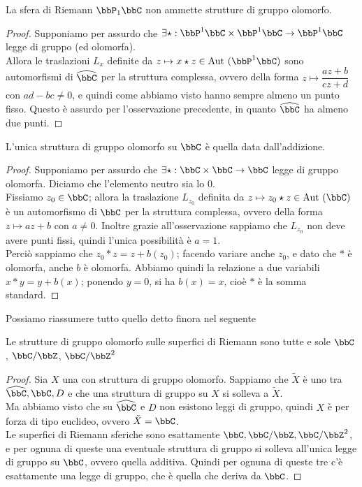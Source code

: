 \begin{proposizione}
La sfera di Riemann $\bbP_{1}\bbC $ non ammette strutture di gruppo olomorfo.
\end{proposizione}
\begin{proof}
    Supponiamo per assurdo che $\exists \star: \bbP^1\bbC \times \bbP^1\bbC \rar \bbP^1\bbC$ legge di gruppo (ed olomorfa).\\
    Allora le traslazioni $L_x$ definite da $z \mapsto x \star z \in \Aut(\bbP^1\bbC)$ sono automorfismi di $\hat\bbC$ per la struttura complessa, ovvero della forma $z\mapsto\dfrac{az+b}{cz+d}$ con $ad-bc\neq0$, e quindi come abbiamo visto hanno sempre almeno un punto fisso.
    Questo è assurdo per l'osservazione precedente, in quanto $\hat\bbC$ ha almeno due punti.
\end{proof}

\begin{proposizione}
L'unica struttura di gruppo olomorfo su $\bbC$ è quella data dall'addizione.
\end{proposizione}
\begin{proof}
    Supponiamo per assurdo che $\exists \star: \bbC \times \bbC \rar \bbC$ legge di gruppo olomorfa. Diciamo che l'elemento neutro sia lo $0$.\\
    Fissiamo $z_0\in\bbC$; allora la traslazione $L_{z_0}$ definita da $z \mapsto z_0 \star z \in \Aut(\bbC)$ è un automorfismo di $\bbC$ per la struttura complessa, ovvero della forma $z\mapsto az+b$ con $a\neq0$.
    Inoltre grazie all'osservazione sappiamo che $L_{z_0}$ non deve avere punti fissi, quindi l'unica possibilità è $a=1$.\\
    Perciò sappiamo che $z_0\ast z=z+b(z_0)$; facendo variare anche $z_0$, e dato che $\ast$ è olomorfa, anche $b$ è olomorfa. Abbiamo quindi la relazione a due variabili $x\ast y=y+b(x)$; ponendo $y=0$, si ha $b(x)=x$, cioè $\ast$ è la somma standard.
\end{proof}

Possiamo riassumere tutto quello detto finora nel seguente

\begin{teorema}
    Le strutture di gruppo olomorfo sulle superfici di Riemann sono tutte e sole $\bbC$, $\bbC / \bbZ$, $\bbC / \bbZ^2$
\end{teorema}
\begin{proof}
    Sia $X$ una \sdR con struttura di gruppo olomorfo. Sappiamo che $\tilde X$ è uno tra $\hat\bbC,\bbC,D$ e che una struttura di gruppo su $X$ si solleva a $\tilde X$.\\
    Ma abbiamo visto che su $\hat\bbC$ e $D$ non esistono leggi di gruppo, quindi $X$ è per forza di tipo euclideo, ovvero $\tilde X=\bbC$.\\
    Le superfici di Riemann sferiche sono esattamente $\bbC, \bbC / \bbZ, \bbC / \bbZ^2$, e per ognuna di queste una eventuale struttura di gruppo si solleva all'unica legge di gruppo su $\bbC$, ovvero quella additiva. Quindi per ognuna di queste tre c'è esattamente una legge di gruppo, che è quella che deriva da $\bbC$.
\end{proof}

